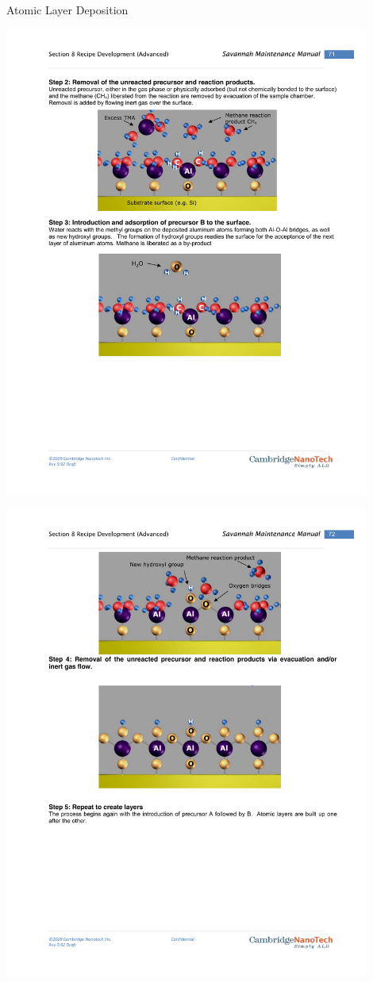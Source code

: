 \documentclass[professionalfont]{beamer}
\begin{document}
\begin{frame}{Atomic Layer Deposition}
\begin{overprint}
		\centerline{\includegraphics[width=0.9\textwidth]{./Graphics/Synthesis/TMA4}}
		\centerline{\includegraphics[width=0.9\textwidth]{./Graphics/Synthesis/TMA5}}

\end{overprint}
\end{frame}
\end{document}

